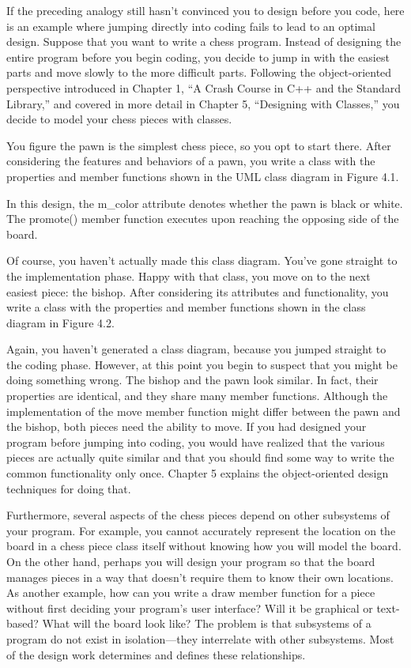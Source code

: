 If the preceding analogy still hasn’t convinced you to design before you code, here is an example where jumping directly into coding fails to lead to an optimal design. Suppose that you want to write a chess program. Instead of designing the entire program before you begin coding, you decide to jump in with the easiest parts and move slowly to the more difficult parts. Following the object-oriented perspective introduced in Chapter 1, “A Crash Course in C++ and the Standard Library,” and covered in more detail in Chapter 5, “Designing with Classes,” you decide to model your chess pieces with classes.

You figure the pawn is the simplest chess piece, so you opt to start there. After considering the features and behaviors of a pawn, you write a class with the properties and member functions shown in the UML class diagram in Figure 4.1.


In this design, the m\_color attribute denotes whether the pawn is black or white. The promote() member function executes upon reaching the opposing side of the board.

Of course, you haven’t actually made this class diagram. You’ve gone straight to the implementation phase. Happy with that class, you move on to the next easiest piece: the bishop. After considering its attributes and functionality, you write a class with the properties and member functions shown in the class diagram in Figure 4.2.


Again, you haven’t generated a class diagram, because you jumped straight to the coding phase. However, at this point you begin to suspect that you might be doing something wrong. The bishop and the pawn look similar. In fact, their properties are identical, and they share many member functions. Although the implementation of the move member function might differ between the pawn and the bishop, both pieces need the ability to move. If you had designed your program before jumping into coding, you would have realized that the various pieces are actually quite similar and that you should find some way to write the common functionality only once. Chapter 5 explains the object-oriented design techniques for doing that.

Furthermore, several aspects of the chess pieces depend on other subsystems of your program. For example, you cannot accurately represent the location on the board in a chess piece class itself without knowing how you will model the board. On the other hand, perhaps you will design your program so that the board manages pieces in a way that doesn’t require them to know their own locations. As another example, how can you write a draw member function for a piece without first deciding your program’s user interface? Will it be graphical or text-based? What will the board look like? The problem is that subsystems of a program do not exist in isolation—they interrelate with other subsystems. Most of the design work determines and defines these relationships.




